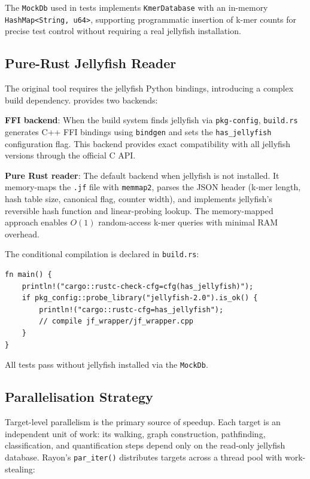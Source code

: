 The \texttt{MockDb} used in tests implements \texttt{KmerDatabase} with an
in-memory \texttt{HashMap<String, u64>}, supporting programmatic insertion of
k-mer counts for precise test control without requiring a real jellyfish
installation.

\subsection{Pure-Rust Jellyfish Reader}
\label{sec:jf-reader}

The original \km{} tool requires the jellyfish Python bindings, introducing a
complex build dependency.  \kmerdet{} provides two backends:

\textbf{FFI backend}: When the build system finds jellyfish via \texttt{pkg-config},
\texttt{build.rs} generates C++ FFI bindings using \texttt{bindgen} and sets the
\texttt{has\_jellyfish} configuration flag.  This backend provides exact
compatibility with all jellyfish versions through the official C API.

\textbf{Pure Rust reader}: The default backend when jellyfish is not installed.
It memory-maps the \texttt{.jf} file with \texttt{memmap2}, parses the JSON
header (k-mer length, hash table size, canonical flag, counter width), and
implements jellyfish's reversible hash function and linear-probing lookup.  The
memory-mapped approach enables $O(1)$ random-access k-mer queries with minimal
RAM overhead.

The conditional compilation is declared in \texttt{build.rs}:

\begin{lstlisting}[style=rust,
  caption={Conditional jellyfish FFI in build.rs.}]
fn main() {
    println!("cargo::rustc-check-cfg=cfg(has_jellyfish)");
    if pkg_config::probe_library("jellyfish-2.0").is_ok() {
        println!("cargo::rustc-cfg=has_jellyfish");
        // compile jf_wrapper/jf_wrapper.cpp
    }
}
\end{lstlisting}

All tests pass without jellyfish installed via the \texttt{MockDb}.

\subsection{Parallelisation Strategy}
\label{sec:parallelism}

Target-level parallelism is the primary source of speedup.  Each target is an
independent unit of work: its walking, graph construction, pathfinding,
classification, and quantification steps depend only on the read-only jellyfish
database.  Rayon's \texttt{par\_iter()} distributes targets across a thread pool
with work-stealing:

